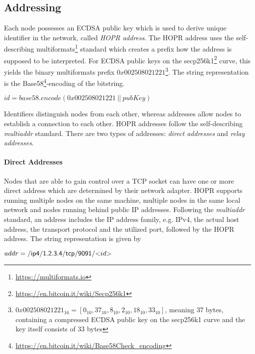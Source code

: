 \subsection{Addressing}
\label{sec:p2p:addressing}

Each node possesses an ECDSA public key which is used to derive unique identifier in the network, called \textit{HOPR address}. The HOPR address uses the self-describing multiformats\footnote{\href{https://multiformats.io}{https://multiformats.io}} standard which creates a prefix how the address is supposed to be interpreted. For ECDSA public keys on the secp256k1\footnote{\href{https://en.bitcoin.it/wiki/Secp256k1}{https://en.bitcoin.it/wiki/Secp256k1}} curve, this yields the binary multiformats prefix $0x002508021221$\footnote{$0x002508021221_{16} = [ 0_{10}, 37_{10}, 8_{10}, 2_{10}, 18_{10}, 33_{10} ]$, meaning 37 bytes, containing a compressed ECDSA public key on the secp256k1 curve and the key itself consists of 33 bytes}. The string representation is the Base58\footnote{\href{https://en.bitcoin.it/wiki/Base58Check_encoding}{https://en.bitcoin.it/wiki/Base58Check\_encoding}}-encoding of the bitstring.

\begin{center}
    $id = base58.encode(0x002508021221 \ || \ pubKey)$
\end{center}

Identifiers distinguish nodes from each other, whereas addresses allow nodes to establish a connection to each other. HOPR addresses follow the self-describing \textit{multiaddr} standard. There are two types of addresses: \textit{direct addresses} and \textit{relay addresses}.

\paragraph{Direct Addresses}

Nodes that are able to gain control over a TCP socket can have one or more direct address which are determined by their network adapter. HOPR supports running multiple nodes on the same machine, multiple nodes in the same local network and nodes running behind public IP addresses. Following the \textit{multiaddr} standard, an address includes the IP address family, e.g. IPv4, the actual host address, the transport protocol and the utilized port, followed by the HOPR address. The string representation is given by

\begin{center}
    $addr = \mathsf{/ip4/1.2.3.4/tcp/9091/}\text{\textless$id$\textgreater{}}$
\end{center}

